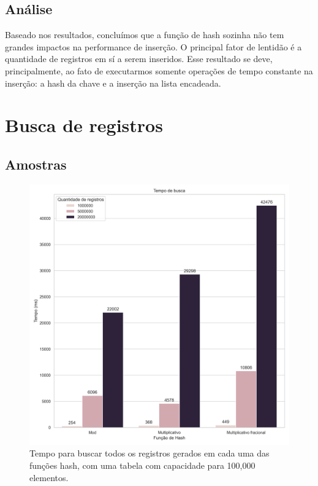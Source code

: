 \documentclass[12pt]{article}
\begin{document}
\newpage
\subsection{Análise}
Baseado nos resultados, concluímos que a função de hash sozinha não tem grandes impactos na performance de inserção. O principal fator de lentidão é a quantidade de registros em sí a serem inseridos.
Esse resultado se deve, principalmente, ao fato de executarmos somente operações de tempo constante na inserção: a hash da chave e a inserção na lista encadeada.

\newpage
\section{Busca de registros}

\subsection{Amostras}

\begin{figure}[ht]
\centering
\includegraphics[width=\textwidth,height=\textheight,keepaspectratio]{figures/lookup_runtime_100000.png}
\caption{Tempo para buscar todos os registros gerados em cada uma das funções hash, com uma tabela com capacidade para 100,000 elementos.}
\end{figure}
\end{document}
